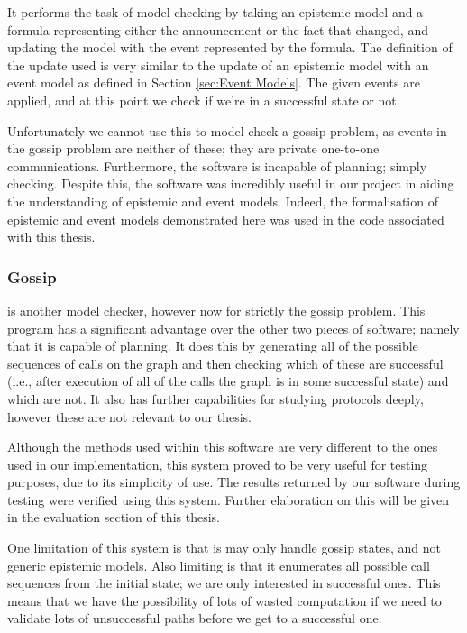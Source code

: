 \documentclass[12pt, a4paper]{article}
\begin{document}
It performs the task of model checking by taking an epistemic model and a
formula representing either the announcement or the fact that changed, and
updating the model with the event represented by the formula. The definition of
the update used is very similar to the update of an epistemic model with an
event model as defined in Section \ref{sec:Event Models}. The given events are
applied, and at this point we check if we're in a successful state or not.

\bigskip

Unfortunately we cannot use this to model check a gossip problem, as events in
the gossip problem are neither of these; they are private one-to-one
communications. Furthermore, the software is incapable of planning; simply
checking. Despite this, the software was incredibly useful in our project in
aiding the understanding of epistemic and event models. Indeed, the
formalisation of epistemic and event models demonstrated here was used in the
code associated with this thesis.

\subsubsection{Gossip}

\cite{GithubGossip} is another model checker, however now for strictly the
gossip problem. This program has a significant advantage over the other two
pieces of software; namely that it is capable of planning. It does this by
generating all of the possible sequences of calls on the graph and then checking
which of these are successful (i.e., after execution of all of the calls the
graph is in some successful state) and which are not. It also has further
capabilities for studying protocols deeply, however these are not relevant to
our thesis.

Although the methods used within this software are very different to the ones
used in our implementation, this system proved to be very useful for testing
purposes, due to its simplicity of use. The results returned by our software
during testing were verified using this system. Further elaboration on this will
be given in the evaluation section of this thesis.

One limitation of this system is that is may only handle gossip states, and not
generic epistemic models. Also limiting is that it enumerates all possible call
sequences from the initial state; we are only interested in successful ones.
This means that we have the possibility of lots of wasted computation if we need
to validate lots of unsuccessful paths before we get to a successful one. 
\end{document}

